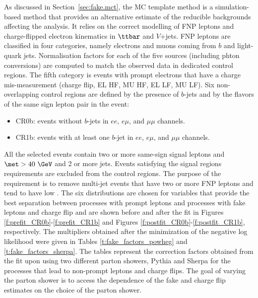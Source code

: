 As discussed in Section~\ref{sec:fake.mct}, the MC template method is
 a simulation-based method that provides an alternative estimate of the reducible backgrounds affecting the analysis.
It relies on the correct modelling of FNP leptons and charge-flipped electron kinematics in $\ttbar$ 
and $V$+jets.
FNP leptons are classified in four categories, namely electrons and muons coming 
from $b$ and light-quark jets. Normalisation factors for each of the five sources (including phton conversions) are computed to match the observed data 
in dedicated control regions. The fifth category is events with prompt electrons that have a charge mis-measurement 
(charge flip, EL HF, MU HF, EL LF, MU LF).
Six non-overlapping control regions are defined by the presence of $b$-jets and by the flavors of the same sign lepton pair in the event:
\begin{itemize}
\item CR0b: events without $b$-jets in $ee$, $e\mu$, and $\mu\mu$ channels.
\item CR1b: events with at least one $b$-jet in $ee$, $e\mu$, and $\mu\mu$ channels.
\end{itemize}
All the selected events contain two or more same-sign signal leptons and \\$\met >40~\GeV$ and 2 or more jets. 
Events satisfying the signal regions requirements are excluded from the control regions. 
The purpose of the \met requirement is to remove multi-jet events that have two or more FNP leptons and tend to have low \met. 
The six distributions are chosen for variables that provide the best separation between processes with prompt leptons and processes with 
fake leptons and charge flip and are shown 
before and after the fit in Figures \ref{f:prefit_CR0b}-\ref{f:prefit_CR1b} and Figures \ref{f:postfit_CR0b}-\ref{f:postfit_CR1b}, 
respectively. 
The multipliers obtained after the minimization of the negative log likelihood were given 
in Tables \ref{t:fake_factors_powheg} and \ref{t:fake_factors_sherpa}.
The tables represent the correction factors obtained from the fit upon using two different parton showers, Pythia and Sherpa
for the processes that lead to non-prompt leptons and charge flips.
The goal of varying the parton shower is to access the dependence of the fake and charge flip estimates on the choice of the 
parton shower. 

